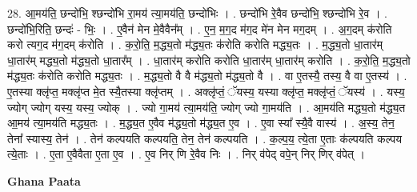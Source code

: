 \documentclass[17pt]{extarticle}
\begin{document}
28. आ॒मय॑ति॒ छन्दो॑भि॒ श्छन्दो॑भि रा॒मय॑ त्या॒मय॑ति॒ छन्दो॑भिः । . छन्दो॑भि रे॒वैव छन्दो॑भि॒ श्छन्दो॑भि रे॒व । . छन्दो॑भि॒रिति॒ छन्दः॑ - भिः॒ । . ए॒वैन॑ मेन मे॒वैवैन᳚म् । . ए॒न॒ म॒ग॒द म॑ग॒द मे॑न मेन मग॒दम् । . अ॒ग॒दम् क॑रोति करो त्यग॒द म॑ग॒दम् क॑रोति । . क॒रो॒ति॒ म॒द्ध्य॒तो म॑द्ध्य॒तः क॑रोति करोति मद्ध्य॒तः । . म॒द्ध्य॒तो धा॒तार॑म् धा॒तार॑म् मद्ध्य॒तो म॑द्ध्य॒तो धा॒तार᳚म् । . धा॒तार॑म् करोति करोति धा॒तार॑म् धा॒तार॑म् करोति । . क॒रो॒ति॒ म॒द्ध्य॒तो म॑द्ध्य॒तः क॑रोति करोति मद्ध्य॒तः । . म॒द्ध्य॒तो वै वै म॑द्ध्य॒तो म॑द्ध्य॒तो वै । . वा ए॒तस्यै॒ तस्य॒ वै वा ए॒तस्य॑ । . ए॒तस्या क्लृ॑प्त॒ मक्लृ॑प्त मे॒त स्यै॒तस्या क्लृ॑प्तम् । . अक्लृ॑प्तं॒ ॅयस्य॒ यस्या क्लृ॑प्त॒ मक्लृ॑प्तं॒ ॅयस्य॑ । . यस्य॒ ज्योग् ज्योग् यस्य॒ यस्य॒ ज्योक् । . ज्यो गा॒मय॑ त्या॒मय॑ति॒ ज्योग् ज्यो गा॒मय॑ति । . आ॒मय॑ति मद्ध्य॒तो म॑द्ध्य॒त आ॒मय॑ त्या॒मय॑ति मद्ध्य॒तः । . म॒द्ध्य॒त ए॒वैव म॑द्ध्य॒तो म॑द्ध्य॒त ए॒व । . ए॒वा स्या᳚ स्यै॒वै वास्य॑ । . अ॒स्य॒ तेन॒ तेना᳚ स्यास्य॒ तेन॑ । . तेन॑ कल्पयति कल्पयति॒ तेन॒ तेन॑ कल्पयति । . क॒ल्प॒य॒ त्ये॒ता ए॒ताः क॑ल्पयति कल्पय त्ये॒ताः । . ए॒ता ए॒वैवैता ए॒ता ए॒व । . ए॒व निर् णि रे॒वैव निः । . निर् व॑पेद् वपे॒न् निर् णिर् व॑पेत् । \newline

\textbf{Ghana Paata } \newline
\end{document}
